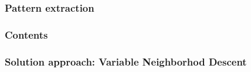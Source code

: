 \begin{frame}
\frametitle{\textbf{Pattern extraction}}
\end{frame}

\begin{frame}[noframenumbering]
\frametitle{\textbf{Contents}}
  \begin{block}{\textbf{\thirdtitleF}}
  \end{block}  

  \begin{block}{\textbf{\thirdtitleS}}
  \end{block}  
\end{frame}

\begin{frame}
\frametitle{\textbf{Solution approach: Variable Neighborhod Descent}}
  \pause
  \begin{adjustbox}{max totalsize={0.8\textwidth}{0.8\textheight},center}
    
  \end{adjustbox}

\end{frame}

